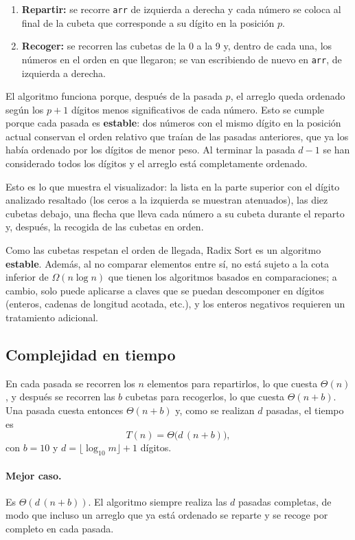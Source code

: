 \begin{enumerate}
  \item \textbf{Repartir:} se recorre \texttt{arr} de izquierda a derecha y cada número se coloca al final de la cubeta que corresponde a su dígito en la posición $p$.
  \item \textbf{Recoger:} se recorren las cubetas de la 0 a la 9 y, dentro de cada una, los números en el orden en que llegaron; se van escribiendo de nuevo en \texttt{arr}, de izquierda a derecha.
\end{enumerate}

El algoritmo funciona porque, después de la pasada $p$, el arreglo queda ordenado según los $p + 1$ dígitos menos significativos de cada número. Esto se cumple porque cada pasada es \textbf{estable}: dos números con el mismo dígito en la posición actual conservan el orden relativo que traían de las pasadas anteriores, que ya los había ordenado por los dígitos de menor peso. Al terminar la pasada $d - 1$ se han considerado todos los dígitos y el arreglo está completamente ordenado.

Esto es lo que muestra el visualizador: la lista en la parte superior con el dígito analizado resaltado (los ceros a la izquierda se muestran atenuados), las diez cubetas debajo, una flecha que lleva cada número a su cubeta durante el reparto y, después, la recogida de las cubetas en orden.

Como las cubetas respetan el orden de llegada, Radix Sort es un algoritmo \textbf{estable}. Además, al no comparar elementos entre sí, no está sujeto a la cota inferior de $\Omega(n \log n)$ que tienen los algoritmos basados en comparaciones; a cambio, solo puede aplicarse a claves que se puedan descomponer en dígitos (enteros, cadenas de longitud acotada, etc.), y los enteros negativos requieren un tratamiento adicional.

\subsection{Complejidad en tiempo}

En cada pasada se recorren los $n$ elementos para repartirlos, lo que cuesta $\Theta(n)$, y después se recorren las $b$ cubetas para recogerlos, lo que cuesta $\Theta(n + b)$. Una pasada cuesta entonces $\Theta(n + b)$ y, como se realizan $d$ pasadas, el tiempo es
\[
  T(n) = \Theta\bigl(d\,(n + b)\bigr),
\]
con $b = 10$ y $d = \lfloor \log_{10} m \rfloor + 1$ dígitos.

\paragraph{Mejor caso.} Es $\Theta(d\,(n + b))$. El algoritmo siempre realiza las $d$ pasadas completas, de modo que incluso un arreglo que ya está ordenado se reparte y se recoge por completo en cada pasada.

